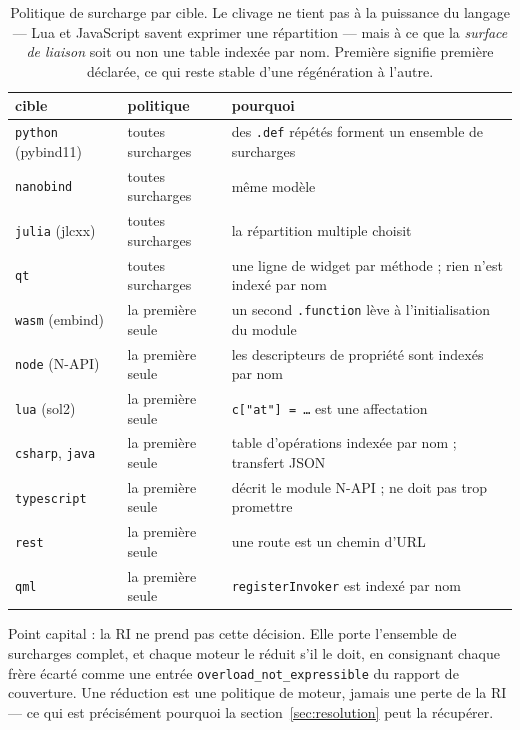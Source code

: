 \documentclass[11pt,a4paper]{article}
\newcommand{\code}[1]{\texttt{\small #1}}
\begin{document}
\begin{table}[h]
\centering\small
\begin{tabular}{lll}
\toprule
cible & politique & pourquoi \\
\midrule
\code{python} (pybind11) & toutes surcharges & des \code{.def} répétés forment un ensemble de surcharges \\
\code{nanobind}         & toutes surcharges & même modèle \\
\code{julia} (jlcxx)    & toutes surcharges & la répartition multiple choisit \\
\code{qt}               & toutes surcharges & une ligne de widget par méthode ; rien n'est indexé par nom \\
\midrule
\code{wasm} (embind)    & la première seule & un second \code{.function} lève à l'initialisation du module \\
\code{node} (N-API)     & la première seule & les descripteurs de propriété sont indexés par nom \\
\code{lua} (sol2)       & la première seule & \code{c["at"] = \dots} est une affectation \\
\code{csharp}, \code{java} & la première seule & table d'opérations indexée par nom ; transfert JSON \\
\code{typescript}       & la première seule & décrit le module N-API ; ne doit pas trop promettre \\
\code{rest}             & la première seule & une route est un chemin d'URL \\
\code{qml}              & la première seule & \code{registerInvoker} est indexé par nom \\
\bottomrule
\end{tabular}
\caption{Politique de surcharge par cible. Le clivage ne tient pas à la
puissance du langage --- Lua et JavaScript savent exprimer une répartition ---
mais à ce que la \emph{surface de liaison} soit ou non une table indexée par
nom. \og Première \fg{} signifie première déclarée, ce qui reste stable d'une
régénération à l'autre.}
\label{tab:overloads}
\end{table}

Point capital : la RI ne prend pas cette décision. Elle porte l'ensemble de
surcharges complet, et chaque moteur le réduit s'il le doit, en consignant
chaque frère écarté comme une entrée
\code{overload\_not\_expressible} du rapport de couverture. Une réduction est une
politique de moteur, jamais une perte de la RI --- ce qui est précisément
pourquoi la section~\ref{sec:resolution} peut la récupérer.
\end{document}
